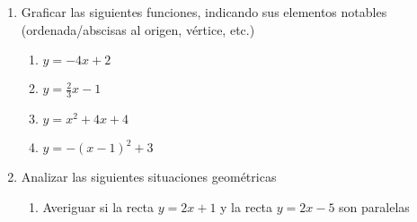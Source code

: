 \documentclass[a4paper]{article}
\newcommand{\answer}{\item[**]}
\newcommand{\exercise}{\item}
\begin{document}
\begin{enumerate}
\begin{multicols}{2}
\begin{enumerate} [label=(\alph*)]
		\item $3 \sqrt{x}$ con $x \in \mathbb{N}$
		\answer Pertenece a $\mathbb{R}$, por ser la raíz cuadrada de un número natural.

		\item $\displaystyle\frac{x^2}{x-4}$ con $x \in \mathbb{Z}$ y $x \neq 4$
		\answer Pertenece a $\mathbb{Q}$, por ser el cociente de un número entero y un número entero distinto de cero.

		\item $\displaystyle\frac{\sqrt{3}x-3}{2}$ con $x \in \mathbb{Z}$
		\answer Pertenece a $\mathbb{R}$, por ser el cociente de un número irracional y un número entero. 

		\item $x+3$ con $x \in \mathbb{Q}$
		\answer Pertenece a $\mathbb{Q}$, por ser la suma de dos números racionales.

		\item $\displaystyle\frac{1}{x}$ con $x \in \mathbb{Q}$ y $x \neq 0$
		\answer Pertenece a $\mathbb{Q}$, por ser el cociente de dos números racionales.

		\item $\sqrt{x}$ con $x \in \mathbb{Q}$
		\answer Pertenece a $\mathbb{R}$, por ser la raíz cuadrada de un número racional.
	\end{enumerate}
	\end{multicols}

	\exercise Graficar las siguientes funciones, indicando sus elementos notables (ordenada/abscisas al origen, vértice, etc.)
	\begin{enumerate} [label=(\alph*)]
		\item $y=-4x+2$

		\item $y=\displaystyle\frac{2}{3}x-1$
		
		\item $y=x^2+4x+4$

		\item $y=-(x-1)^2+3$
	
	\end{enumerate}

	\exercise Analizar las siguientes situaciones geométricas
	\begin{enumerate} [label=(\alph*)]
		\item Averiguar si la recta $y=2x+1$ y la recta $y=2x-5$ son paralelas


\end{enumerate}
\end{enumerate}
\end{document}

